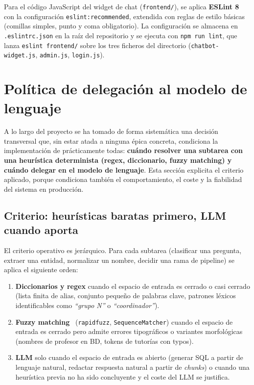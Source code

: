 Para el código JavaScript del widget de chat (\texttt{frontend/}), se aplica \textbf{ESLint 8}~\cite{eslint} con la configuración \texttt{eslint:recommended}, extendida con reglas de estilo básicas (comillas simples, punto y coma obligatorio). La configuración se almacena en \texttt{.eslintrc.json} en la raíz del repositorio y se ejecuta con \texttt{npm run lint}, que lanza \texttt{eslint frontend/} sobre los tres ficheros del directorio (\texttt{chatbot-widget.js}, \texttt{admin.js}, \texttt{login.js}).

\section{Política de delegación al modelo de lenguaje}
\label{sec:politica-llm}

A lo largo del proyecto se ha tomado de forma sistemática una decisión transversal que, sin estar atada a ninguna épica concreta, condiciona la implementación de prácticamente todas: \textbf{cuándo resolver una subtarea con una heurística determinista (regex, diccionario, fuzzy matching) y cuándo delegar en el modelo de lenguaje}. Esta sección explicita el criterio aplicado, porque condiciona también el comportamiento, el coste y la fiabilidad del sistema en producción.

\subsection{Criterio: heurísticas baratas primero, LLM cuando aporta}

El criterio operativo es jerárquico. Para cada subtarea (clasificar una pregunta, extraer una entidad, normalizar un nombre, decidir una rama de pipeline) se aplica el siguiente orden:

\begin{enumerate}
    \item \textbf{Diccionarios y regex} cuando el espacio de entrada es cerrado o casi cerrado (lista finita de alias, conjunto pequeño de palabras clave, patrones léxicos identificables como \textit{``grupo N''} o \textit{``coordinador''}).
    \item \textbf{Fuzzy matching}~\cite{cohen2003comparison} (\texttt{rapidfuzz}, \texttt{SequenceMatcher}) cuando el espacio de entrada es cerrado pero admite errores tipográficos o variantes morfológicas (nombres de profesor en BD, tokens de tutorías con typos).
    \item \textbf{LLM} solo cuando el espacio de entrada es abierto (generar SQL a partir de lenguaje natural, redactar respuesta natural a partir de \textit{chunks}) o cuando una heurística previa no ha sido concluyente y el coste del LLM se justifica.
\end{enumerate}

